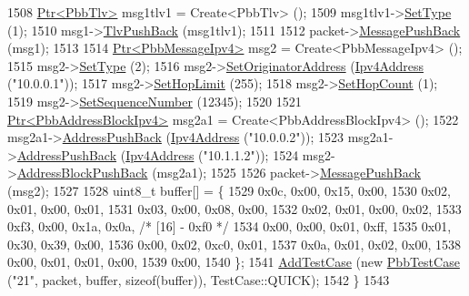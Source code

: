 \begin{DoxyCode}
1508     \hyperlink{classns3_1_1Ptr}{Ptr<PbbTlv>} msg1tlv1 = Create<PbbTlv> ();
1509     msg1tlv1->\hyperlink{classns3_1_1PbbTlv_a90a0452018ed364ac37c3ad116dd718b}{SetType} (1);
1510     msg1->\hyperlink{classns3_1_1PbbMessage_aac70b2672f79765cf5cc5b6666018165}{TlvPushBack} (msg1tlv1);
1511 
1512     packet->\hyperlink{classns3_1_1PbbPacket_a4a3170001ef758d9c9c4375b8f089826}{MessagePushBack} (msg1);
1513 
1514     \hyperlink{classns3_1_1Ptr}{Ptr<PbbMessageIpv4>} msg2 = Create<PbbMessageIpv4> ();
1515     msg2->\hyperlink{classns3_1_1PbbMessage_a4b3d1eaabd3e7412a46ac79bf3360dac}{SetType} (2);
1516     msg2->\hyperlink{classns3_1_1PbbMessage_a52ac135a2bec53db5e8f46b8b8a25e7c}{SetOriginatorAddress} (\hyperlink{classns3_1_1Ipv4Address}{Ipv4Address} (\textcolor{stringliteral}{"10.0.0.1"}));
1517     msg2->\hyperlink{classns3_1_1PbbMessage_a532a7e5e135f7491f8a84ab1dfadd28f}{SetHopLimit} (255);
1518     msg2->\hyperlink{classns3_1_1PbbMessage_a882ec7e2e9a9dff6297152c196d54ce4}{SetHopCount} (1);
1519     msg2->\hyperlink{classns3_1_1PbbMessage_a8c24696ac67507afa03c9750daccc47d}{SetSequenceNumber} (12345);
1520 
1521     \hyperlink{classns3_1_1Ptr}{Ptr<PbbAddressBlockIpv4>} msg2a1 = Create<PbbAddressBlockIpv4> ();
1522     msg2a1->\hyperlink{classns3_1_1PbbAddressBlock_a7be545a53d69bd426dbebcf752ed8371}{AddressPushBack} (\hyperlink{classns3_1_1Ipv4Address}{Ipv4Address} (\textcolor{stringliteral}{"10.0.0.2"}));
1523     msg2a1->\hyperlink{classns3_1_1PbbAddressBlock_a7be545a53d69bd426dbebcf752ed8371}{AddressPushBack} (\hyperlink{classns3_1_1Ipv4Address}{Ipv4Address} (\textcolor{stringliteral}{"10.1.1.2"}));
1524     msg2->\hyperlink{classns3_1_1PbbMessage_a5f623bad2fb1adde7da885e1c92d5311}{AddressBlockPushBack} (msg2a1);
1525 
1526     packet->\hyperlink{classns3_1_1PbbPacket_a4a3170001ef758d9c9c4375b8f089826}{MessagePushBack} (msg2);
1527 
1528     uint8\_t buffer[] = \{
1529       0x0c, 0x00, 0x15, 0x00,
1530       0x02, 0x01, 0x00, 0x01,
1531       0x03, 0x00, 0x08, 0x00,
1532       0x02, 0x01, 0x00, 0x02,
1533       0xf3, 0x00, 0x1a, 0x0a,   \textcolor{comment}{/* [16] - 0xf0 */}
1534       0x00, 0x00, 0x01, 0xff,
1535       0x01, 0x30, 0x39, 0x00,
1536       0x00, 0x02, 0xc0, 0x01,
1537       0x0a, 0x01, 0x02, 0x00,
1538       0x00, 0x01, 0x01, 0x00,
1539       0x00,
1540     \};
1541     \hyperlink{classns3_1_1TestCase_a3718088e3eefd5d6454569d2e0ddd835}{AddTestCase} (\textcolor{keyword}{new} \hyperlink{classPbbTestCase}{PbbTestCase} (\textcolor{stringliteral}{"21"}, packet, buffer, \textcolor{keyword}{sizeof}(buffer)), 
      TestCase::QUICK);
1542   \}
1543 

\end{DoxyCode}
